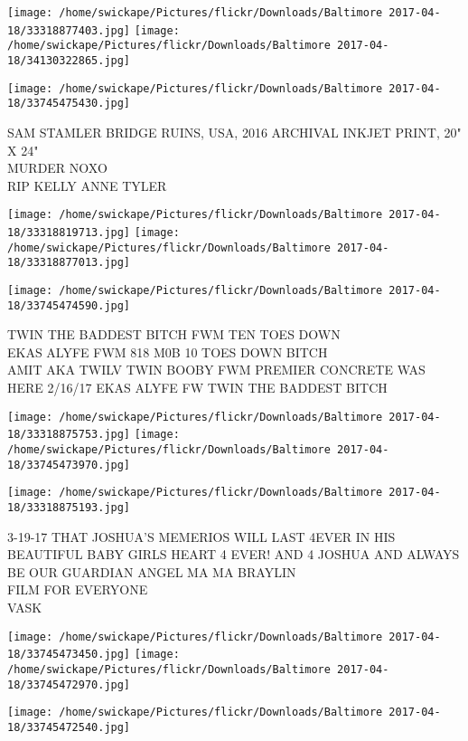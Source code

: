 \documentclass[10pt,letterpaper]{article}
\begin{document}
\texttt{[image: /home/swickape/Pictures/flickr/Downloads/Baltimore 2017-04-18/33318877403.jpg]}
\texttt{[image: /home/swickape/Pictures/flickr/Downloads/Baltimore 2017-04-18/34130322865.jpg]}

\vspace{0.25in}
\texttt{[image: /home/swickape/Pictures/flickr/Downloads/Baltimore 2017-04-18/33745475430.jpg]}

SAM STAMLER BRIDGE RUINS, USA, 2016 ARCHIVAL INKJET PRINT, 20" X 24"\\
MURDER NOXO\\
RIP KELLY ANNE TYLER
\pagebreak

\texttt{[image: /home/swickape/Pictures/flickr/Downloads/Baltimore 2017-04-18/33318819713.jpg]}
\texttt{[image: /home/swickape/Pictures/flickr/Downloads/Baltimore 2017-04-18/33318877013.jpg]}

\vspace{0.25in}
\texttt{[image: /home/swickape/Pictures/flickr/Downloads/Baltimore 2017-04-18/33745474590.jpg]}

TWIN THE BADDEST BITCH FWM TEN TOES DOWN\\
EKAS ALYFE FWM 818 M0B 10 TOES DOWN BITCH\\
AMIT AKA TWILV TWIN BOOBY FWM PREMIER CONCRETE WAS HERE 2/16/17 EKAS ALYFE FW TWIN THE BADDEST BITCH
\pagebreak

\texttt{[image: /home/swickape/Pictures/flickr/Downloads/Baltimore 2017-04-18/33318875753.jpg]}
\texttt{[image: /home/swickape/Pictures/flickr/Downloads/Baltimore 2017-04-18/33745473970.jpg]}

\vspace{0.25in}
\texttt{[image: /home/swickape/Pictures/flickr/Downloads/Baltimore 2017-04-18/33318875193.jpg]}

3{-}19{-}17 THAT JOSHUA'S MEMERIOS WILL LAST 4EVER IN HIS BEAUTIFUL BABY GIRLS HEART 4 EVER!  AND 4 JOSHUA AND ALWAYS BE OUR GUARDIAN ANGEL MA MA BRAYLIN\\
FILM FOR EVERYONE\\
VASK
\pagebreak

\texttt{[image: /home/swickape/Pictures/flickr/Downloads/Baltimore 2017-04-18/33745473450.jpg]}
\texttt{[image: /home/swickape/Pictures/flickr/Downloads/Baltimore 2017-04-18/33745472970.jpg]}

\texttt{[image: /home/swickape/Pictures/flickr/Downloads/Baltimore 2017-04-18/33745472540.jpg]}
\end{document}
